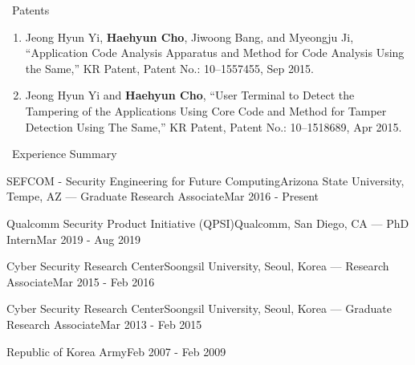 \documentclass{resume} %
\makeatletter
\newlength{\bibhang}
\newlength{\bibsep}
{\@listi \global\bibsep\itemsep \global\advance\bibsep by\parsep}
\newenvironment{bibsection}%
{\begin{enumerate}{}{%
			\setlength{\leftmargin}{\bibhang}%
			\setlength{\itemindent}{-\leftmargin}%
			\setlength{\itemsep}{\bibsep}%
			\setlength{\parsep}{\z@}%
			\setlength{\partopsep}{0pt}%
			\setlength{\topsep}{0pt}}}
	{\end{enumerate}\vspace{-.6\baselineskip}}
\makeatother
\begin{document}
\begin{rSection}{\faGenderless~Patents}
	
	\begin{bibsection}
		\item Jeong Hyun Yi, {\bf Haehyun Cho}, Jiwoong Bang, and Myeongju Ji,
		``Application Code Analysis Apparatus and Method for Code Analysis Using the Same,'' KR Patent, 
		Patent No.: 10--1557455, Sep 2015.

		\item Jeong Hyun Yi and {\bf Haehyun Cho}, 
		``User Terminal to Detect the Tampering of the Applications Using Core Code and Method for Tamper Detection Using The Same,'' KR Patent, 
		Patent No.: 10--1518689, Apr 2015.
	\end{bibsection}
	
	\vspace{5mm}
\end{rSection}


\begin{rSection}{\faGenderless~Experience Summary}

	\begin{rSubsection2}
		{SEFCOM - {\small Security Engineering for Future Computing}}{Arizona State University, Tempe, AZ}
		{--- Graduate Research Associate}{Mar 2016 - Present}
	\end{rSubsection2}
    \vspace{-3mm}
   
    \begin{rSubsection2}
        {Qualcomm Security Product Initiative (QPSI)}{Qualcomm, San Diego, CA}
        {--- PhD Intern}{Mar 2019 - Aug 2019}
    \end{rSubsection2}
    \vspace{-3mm}

	\begin{rSubsection2}
		{Cyber Security Research Center}{Soongsil University, Seoul, Korea}
		{--- Research Associate}{Mar 2015 - Feb 2016}
	\end{rSubsection2}
	\vspace{-3mm}
	\begin{rSubsection2}
		{Cyber Security Research Center}{Soongsil University, Seoul, Korea}
		{--- Graduate Research Associate}{Mar 2013 - Feb 2015}
	\end{rSubsection2}
	\vspace{-3mm}

	\begin{rSubsection2}
		{Republic of Korea Army}{Feb 2007 - Feb 2009}
		{}{}
	\end{rSubsection2}

\end{rSection}
\end{document}
